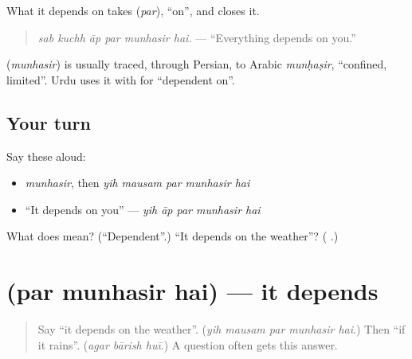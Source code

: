 What it depends on takes \textbf{} (\emph{par}), \textquotedblleft{}on\textquotedblright{}, and \textbf{} closes it.

\begin{quote}
\textbf{     }
\end{quote}

\begin{quote}
\emph{sab kuchh āp par munhasir hai.} — \textquotedblleft{}Everything depends on you.\textquotedblright{}
\end{quote}

\begin{cousinweb}
\textbf{} (\emph{munhasir}) is usually traced, through Persian, to Arabic \emph{munḥaṣir}, \textquotedblleft{}confined, limited\textquotedblright{}. Urdu uses it with \textbf{} for \textquotedblleft{}dependent on\textquotedblright{}.
\end{cousinweb}

\subsection*{Your turn}
Say these aloud:

\begin{itemize}
\raggedright
  \item \emph{munhasir}, then \emph{yih mausam par munhasir hai}
  \item \textquotedblleft{}It depends on you\textquotedblright{} — \emph{yih āp par munhasir hai}
\end{itemize}

\begin{tcolorbox}[breakable,colback=teal!4,colframe=teal!35!black,title={Before you move on}]
What does \textbf{} mean? (\textquotedblleft{}Dependent\textquotedblright{}.) \textquotedblleft{}It depends on the weather\textquotedblright{}? (\textbf{    }.)
\end{tcolorbox}
\section[\texorpdfstring{\ur{پر} \ur{منحصر} \ur{ہے} (par munhasir hai)}{پر منحصر ہے (par munhasir hai)}]{   (par munhasir hai) — it depends}

\label{lesson:UR-C275-par-munhasir-hai}



\begin{quote}
Say \textquotedblleft{}it depends on the weather\textquotedblright{}. (\emph{yih mausam par munhasir hai}.) Then \textquotedblleft{}if it rains\textquotedblright{}. (\emph{agar bārish huī}.) A question often gets this answer.
\end{quote}

